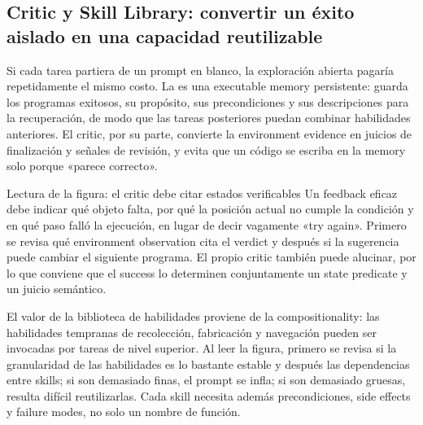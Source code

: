\subsection{Critic y Skill Library: convertir un éxito aislado en una capacidad reutilizable}

Si cada tarea partiera de un prompt en blanco, la exploración abierta pagaría repetidamente el mismo costo. La  es una executable memory persistente: guarda los programas exitosos, su propósito, sus precondiciones y sus descripciones para la recuperación, de modo que las tareas posteriores puedan combinar habilidades anteriores. El critic, por su parte, convierte la environment evidence en juicios de finalización y señales de revisión, y evita que un código se escriba en la memory solo porque «parece correcto».


\begin{knowledgebox}{Lectura de la figura: el critic debe citar estados verificables}
Un feedback eficaz debe indicar qué objeto falta, por qué la posición actual no cumple la condición y en qué paso falló la ejecución, en lugar de decir vagamente «try again». Primero se revisa qué environment observation cita el verdict y después si la sugerencia puede cambiar el siguiente programa. El propio critic también puede alucinar, por lo que conviene que el success lo determinen conjuntamente un state predicate y un juicio semántico.
\end{knowledgebox}


El valor de la biblioteca de habilidades proviene de la compositionality: las habilidades tempranas de recolección, fabricación y navegación pueden ser invocadas por tareas de nivel superior. Al leer la figura, primero se revisa si la granularidad de las habilidades es lo bastante estable y después las dependencias entre skills; si son demasiado finas, el prompt se infla; si son demasiado gruesas, resulta difícil reutilizarlas. Cada skill necesita además precondiciones, side effects y failure modes, no solo un nombre de función.


